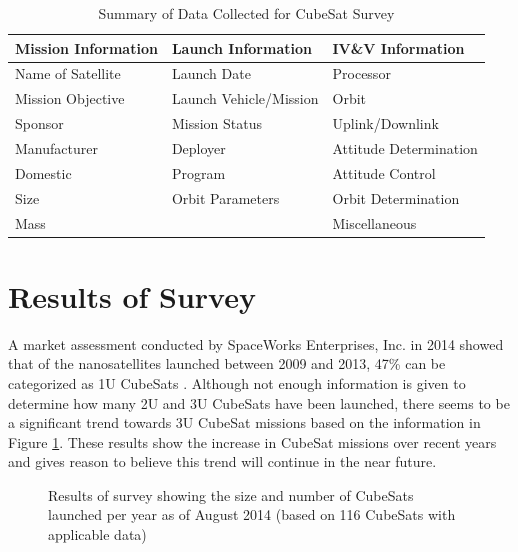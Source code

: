 \documentclass[11pt]{article}
\begin{document}
\begin{table}[h]
\small
\centering
\caption{Summary of Data Collected for CubeSat Survey}
\label{summary}
\begin{tabular}{|l|l|l|}
\hline
\textbf{Mission Information} & \textbf{Launch Information} & \textbf{IV\&V Information} \\ \hline
Name of Satellite & Launch Date & Processor \\ \hline
Mission Objective & Launch Vehicle/Mission & Orbit \\ \hline
Sponsor & Mission Status & Uplink/Downlink \\ \hline
Manufacturer & Deployer & Attitude Determination \\ \hline
Domestic & Program & Attitude Control \\ \hline
Size & Orbit Parameters & Orbit Determination \\ \hline
Mass &  & Miscellaneous \\ \hline
\end{tabular}
\end{table}

\section{Results of Survey}
A market assessment conducted by SpaceWorks Enterprises, Inc. in 2014 showed that of the nanosatellites launched between 2009 and 2013, 47\% can be categorized as 1U CubeSats \cite{MarketAssessment}.  Although not enough information is given to determine how many 2U and 3U CubeSats have been launched, there seems to be a significant trend towards 3U CubeSat missions based on the information in Figure \ref{peryear}.  These results show the increase in CubeSat missions over recent years and gives reason to believe this trend will continue in the near future.

\begin{figure}[h]
\centering
{}
\caption{Results of survey showing the size and number of CubeSats launched per year as of August 2014 (based on 116 CubeSats with applicable data)}
\label{peryear}
\end{figure}
\end{document}
